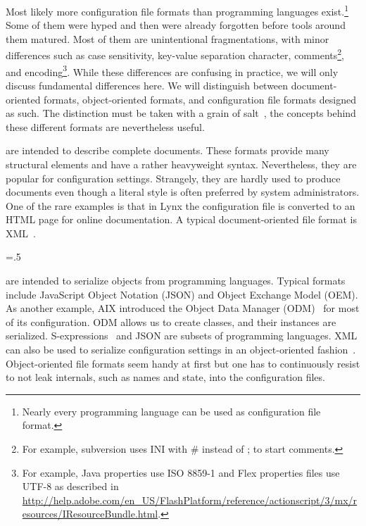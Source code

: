 Most likely more configuration file formats than programming languages exist.\footnote{Nearly every programming language can be used as configuration file format.}
Some of them were hyped and then were already forgotten before tools around them matured.
Most of them are unintentional fragmentations, with minor differences such as case sensitivity, key-value separation character, comments\footnote{For example, subversion uses INI with \# instead of ; to start comments.}, and encoding\footnote{For example, Java properties use ISO 8859-1 and Flex properties files use UTF-8 as described in \url{http://help.adobe.com/en_US/FlashPlatform/reference/actionscript/3/mx/resources/IResourceBundle.html}.}.
While these differences are confusing in practice, we will only discuss fundamental differences here.
We will distinguish between document-oriented formats, object-oriented formats, and configuration file formats designed as such.
The distinction must be taken with a grain of salt~\cite{ducharme2004documents}, the concepts behind these different formats are nevertheless useful.

 are intended to describe complete documents.
These formats provide many structural elements and have a rather heavyweight syntax.
Nevertheless, they are popular for configuration settings.
Strangely, they are hardly used to produce documents even though a literal style is often preferred by system administrators.
One of the rare examples is that in Lynx the configuration file is converted to an HTML page for online documentation.
A typical document-oriented file format is XML~\cite{wadler2003xml}.%
{\parfillskip=0pt \emergencystretch=.5\textwidth \par}

 are intended to serialize objects from programming languages.
Typical formats include JavaScript Object Notation (JSON) and Object Exchange Model (OEM).
As another example, AIX introduced the Object Data Manager (ODM)~\cite{kar2000managing} for most of its configuration.
ODM allows us to create classes, and their instances are serialized.
S-expressions~\cite{mccarthy1960recursive} and JSON are subsets of programming languages. 
XML can also be used to serialize configuration settings in an object-oriented fashion~\cite{kapolka2002unified}.
Object-oriented file formats seem handy at first but one has to continuously resist to not leak internals, such as names and state, into the configuration files.

